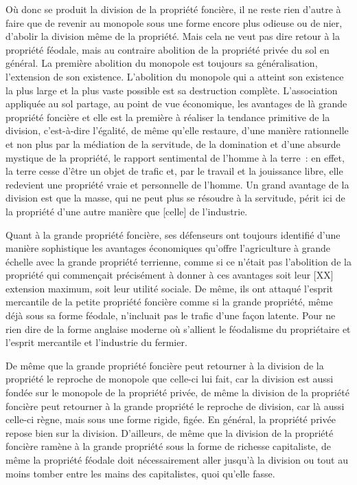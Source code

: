 \documentclass[french,twoside]{book} %
\begin{document}
Où donc se produit la division de la propriété foncière, il ne reste rien d’autre à faire que de revenir au monopole sous une forme encore plus odieuse ou de nier, d’abolir la division même de la propriété. Mais cela ne veut pas dire retour à la propriété féodale, mais au contraire abolition de la propriété privée du sol en général. La première abolition du monopole est toujours sa généralisation, l’extension de son existence. L’abolition du monopole qui a atteint son existence la plus large et la plus vaste possible est sa destruction complète. L’association appliquée au sol partage, au point de vue économique, les avantages de là grande propriété foncière et elle est la première à réaliser la tendance primitive de la division, c’est-à-dire l’égalité, de même qu’elle restaure, d’une manière rationnelle et non plus par la médiation de la servitude, de la domination et d’une absurde mystique de la propriété, le rapport sentimental de l’homme à la terre : en effet, la terre cesse d’être un objet de trafic et, par le travail et la jouissance libre, elle redevient une propriété vraie et personnelle de l’homme. Un grand avantage de la division est que la masse, qui ne peut plus se résoudre à la servitude, périt ici de la propriété d’une autre manière que [celle] de l’industrie.\par
\bigbreak
\noindent Quant à la grande propriété foncière, ses défenseurs ont toujours identifié d’une manière sophistique les avantages économiques qu’offre l’agriculture à grande échelle avec la grande propriété terrienne, comme si ce n’était pas l’abolition de la propriété qui commençait précisément à donner à ces avantages soit leur [XX] extension maximum, soit leur utilité sociale. De même, ils ont attaqué l’esprit mercantile de la petite propriété foncière comme si la grande propriété, même déjà sous sa forme féodale, n’incluait pas le trafic d’une façon latente. Pour ne rien dire de la forme anglaise moderne où s’allient le féodalisme du propriétaire et l’esprit mercantile et l’industrie du fermier.\par
De même que la grande propriété foncière peut retourner à la division de la propriété le reproche de monopole que celle-ci lui fait, car la division est aussi fondée sur le monopole de la propriété privée, de même la division de la propriété foncière peut retourner à la grande propriété le reproche de division, car là aussi celle-ci règne, mais sous une forme rigide, figée. En général, la propriété privée repose bien sur la division. D’ailleurs, de même que la division de la propriété foncière ramène à la grande propriété sous la forme de richesse capitaliste, de même la propriété féodale doit nécessairement aller jusqu’à la division ou tout au moins tomber entre les mains des capitalistes, quoi qu’elle fasse.\par
\end{document}
